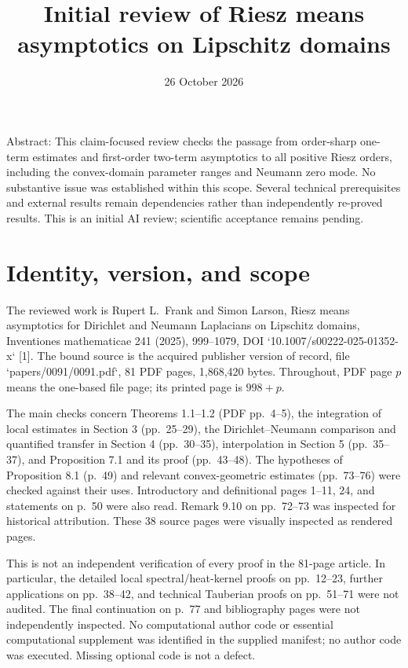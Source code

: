 \documentclass[10pt]{article}
\title{Initial review of Riesz means asymptotics on Lipschitz domains}
\author{}
\date{26 October 2026}
\begin{document}
\maketitle
Abstract: This claim-focused review checks the passage from order-sharp one-term estimates and first-order two-term asymptotics to all positive Riesz orders, including the convex-domain parameter ranges and Neumann zero mode. No substantive issue was established within this scope. Several technical prerequisites and external results remain dependencies rather than independently re-proved results. This is an initial AI review; scientific acceptance remains pending.\par
\section*{Identity, version, and scope}
The reviewed work is Rupert L. Frank and Simon Larson, Riesz means asymptotics for Dirichlet and Neumann Laplacians on Lipschitz domains, Inventiones mathematicae 241 (2025), 999–1079, DOI `10.1007/s00222-025-01352-x` [1]. The bound source is the acquired publisher version of record, file `papers/0091/0091.pdf`, 81 PDF pages, 1,868,420 bytes. Throughout, PDF page \(p\) means the one-based file page; its printed page is \(998+p\).\par
The main checks concern Theorems 1.1–1.2 (PDF pp. 4–5), the integration of local estimates in Section 3 (pp. 25–29), the Dirichlet–Neumann comparison and quantified transfer in Section 4 (pp. 30–35), interpolation in Section 5 (pp. 35–37), and Proposition 7.1 and its proof (pp. 43–48). The hypotheses of Proposition 8.1 (p. 49) and relevant convex-geometric estimates (pp. 73–76) were checked against their uses. Introductory and definitional pages 1–11, 24, and statements on p. 50 were also read. Remark 9.10 on pp. 72–73 was inspected for historical attribution. These 38 source pages were visually inspected as rendered pages.\par
This is not an independent verification of every proof in the 81-page article. In particular, the detailed local spectral/heat-kernel proofs on pp. 12–23, further applications on pp. 38–42, and technical Tauberian proofs on pp. 51–71 were not audited. The final continuation on p. 77 and bibliography pages were not independently inspected. No computational author code or essential computational supplement was identified in the supplied manifest; no author code was executed. Missing optional code is not a defect.\par
\end{document}
